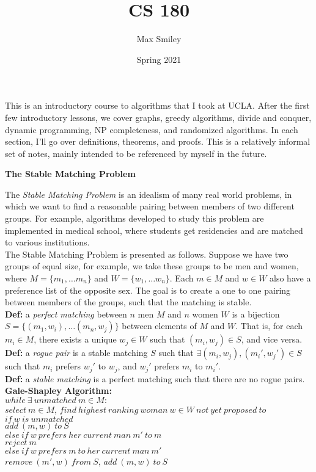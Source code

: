 \documentclass[12pt]{article}
\begin{document}
\title{CS 180}
\author{Max Smiley}
\date{Spring 2021}
\maketitle
This is an introductory course to algorithms that I took at UCLA. After the first few introductory lessons, we cover graphs, greedy algorithms, divide and conquer, dynamic programming, NP completeness, and randomized algorithms. In each section, I'll go over definitions, theorems, and proofs. This is a relatively informal set of notes, mainly intended to be referenced by myself in the future.
\clearpage

\textbf{\Large The Stable Matching Problem}


The \emph{Stable Matching Problem} is an idealism of many real world problems, in which we want to find a reasonable pairing between members of two different groups. For example, algorithms developed to study this problem are implemented in medical school, where students get residencies and are matched to various institutions.\\

The Stable Matching Problem is presented as follows. Suppose we have two groups of equal size, for example, we take these groups to be men and women, where $M = \{ m_1, \dots m_n\}$ and $W = \{ w_1, \dots w_n\}$. Each $m \in M$ and $w \in W$ also have a preference list of the opposite sex. The goal is to create a one to one pairing between members of the groups, such that the matching is stable.\\

\textbf{Def: }a \emph{perfect matching} between $n$ men $M$ and $n$ women $W$ is a bijection $S = \{ (m_1, w_i), \dots (m_n, w_j)\}$ between elements of $M$ and $W$. That is, for each $m_i \in M$, there exists a unique $w_j \in W$ such that $(m_i, w_j) \in S$, and vice versa.\\

\textbf{Def: }a \emph{rogue pair} is a stable matching $S$ such that $\exists (m_i, w_j), (m_i', w_j') \in S$ such that $m_i$ prefers $w_j'$ to $w_j$, and $w_j'$ prefers $m_i$ to $m_i'$.\\

\textbf{Def: }a \emph{stable matching} is a perfect matching such that there are no rogue pairs.\\

\textbf{Gale-Shapley Algorithm: }\\
$while\ \exists\ unmatched\ m \in M:$\\
\- \- \- \- \- $select\ m \in M$, $find\ highest\ ranking\ woman\ w \in W\ not\ yet\ proposed\ to$\\
\- \- \- \- \- $if\ w\ is\ unmatched$\\
\- \- \- \- \- \- \- \- \- \- $add\ (m, w)\ to\ S$\\
\- \- \- \- \- $else\ if\ w\ prefers\ her\ current\ man\ m'\ to\ m$\\
\- \- \- \- \- \- \- \- \- \- $reject\ m$\\
\- \- \- \- \- $else\ if\ w\ prefers\ m\ to\ her\ current\ man\ m'$\\
\- \- \- \- \- \- \- \- \- \- $remove\ (m', w)\ from\ S$, $add\ (m, w)\ to\ S$\\
\end{document}
